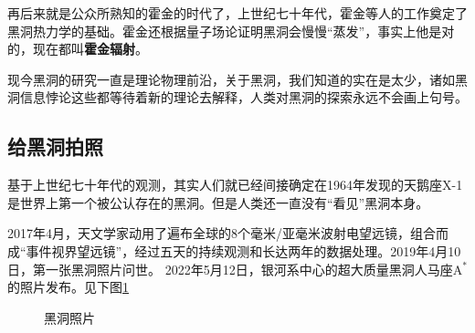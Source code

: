 \documentclass{ctexart}
\begin{document}
    再后来就是公众所熟知的霍金的时代了，上世纪七十年代，霍金等人的工作奠定了黑洞热力学的基础。\cite{bardeen1973four}霍金还根据量子场论证明黑洞会慢慢“蒸发”，事实上他是对的，现在都叫\textbf{霍金辐射}。\cite{hawking1974black}
    
    现今黑洞的研究一直是理论物理前沿，关于黑洞，我们知道的实在是太少，诸如黑洞信息悖论这些都等待着新的理论去解释，人类对黑洞的探索永远不会画上句号。

    \subsection{给黑洞拍照}
    基于上世纪七十年代的观测，其实人们就已经间接确定在1964年发现的天鹅座X-1是世界上第一个被公认存在的黑洞。但是人类还一直没有“看见”黑洞本身。

    2017年4月，天文学家动用了遍布全球的8个毫米/亚毫米波射电望远镜，组合而成“事件视界望远镜”，经过五天的持续观测和长达两年的数据处理。2019年4月10日，第一张黑洞照片问世。
    2022年5月12日，银河系中心的超大质量黑洞人马座$\mathrm{A}^*$的照片发布。见下图\ref{fig:1}
    \begin{figure}[H]
        \centering
        \caption{黑洞照片}
        \label{fig:1}
    \end{figure}
\end{document}

